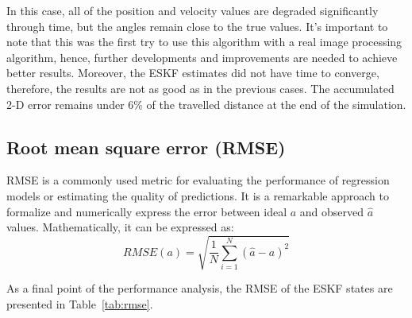 In this case, all of the position and velocity values are degraded significantly through time, but the angles remain close to the true values. It's important to note that this was the first try to use this algorithm with a real image processing algorithm, hence, further developments and improvements are needed to achieve better results. Moreover, the ESKF estimates did not have time to converge, therefore, the results are not as good as in the previous cases. The accumulated 2-D error remains under 6\% of the travelled distance at the end of the simulation.

\subsection{Root mean square error (RMSE)} 

RMSE is a commonly used metric for evaluating the performance of regression models or estimating the quality of predictions. It is a remarkable approach to formalize and numerically express the error between ideal $a$ and observed $\hat{a}$ values. Mathematically, it can be expressed as:
\begin{equation}
    RMSE(a)=\sqrt{\frac{1}{N}\sum_{i=1}^N(\hat{a}-a)^2}
\end{equation}

As a final point of the performance analysis, the RMSE of the ESKF states are presented in Table~\ref{tab:rmse}.

